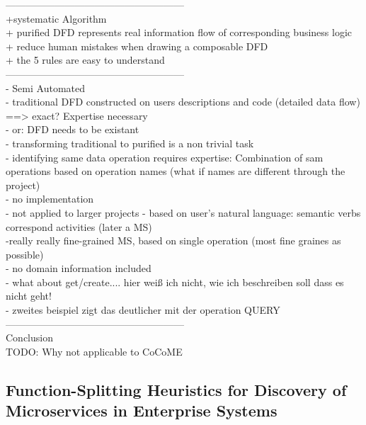 ------------------------------------------------------\\

+systematic Algorithm\\
+ purified DFD represents real information flow of corresponding business logic\\
+ reduce human mistakes when drawing a composable DFD\\
+ the 5 rules are easy to understand \\

------------------------------------------------------\\
- Semi Automated \\
- traditional DFD constructed on users descriptions and code (detailed data flow) ==> exact? Expertise necessary \\
- or: DFD needs to be existant \\
- transforming traditional to purified is a non trivial task \\
- identifying same data operation requires expertise: Combination of sam operations  based on operation names (what if names are different through the project)\\
- no implementation \\
- not applied to larger projects
- based on user's natural language: semantic verbs correspond activities (later a MS) \\
-really really fine-grained MS, based on single operation (most fine graines as possible) \\
- no domain information included\\
- what about get/create....   hier weiß ich nicht, wie ich beschreiben soll dass es nicht geht! \\
- zweites beispiel zigt das deutlicher mit der operation QUERY \\


------------------------------------------------------\\

Conclusion \\

TODO: Why not applicable to CoCoME

\subsection{Function-Splitting Heuristics for Discovery of Microservices in Enterprise Systems}

